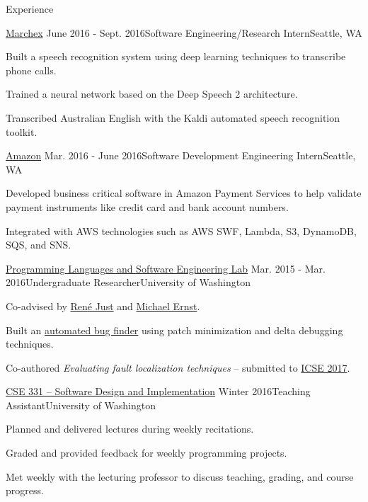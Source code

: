 \documentclass{resume} %
\begin{document}

\begin{rSection}{Experience}

  \begin{rSubsection}{\href{http://www.marchex.com/}{Marchex}}
    {June 2016 - Sept. 2016}{Software Engineering/Research Intern}{Seattle, WA}
  \item Built a speech recognition system using deep learning techniques to transcribe phone calls.
  \item Trained a neural network based on the Deep Speech 2 architecture.
  \item Transcribed Australian English with the Kaldi automated speech recognition toolkit.
  \end{rSubsection}

  \begin{rSubsection}{\href{https://www.amazon.com/}{Amazon}}
    {Mar. 2016 - June 2016}{Software Development Engineering Intern}{Seattle, WA}
  \item Developed business critical software in Amazon Payment Services to help validate payment instruments like credit card and bank account numbers.
  \item Integrated with AWS technologies such as AWS SWF, Lambda, S3, DynamoDB, SQS, and SNS.
  \end{rSubsection}

  \begin{rSubsection}{\href{https://uwplse.org/}{Programming Languages and Software Engineering Lab}}
    {Mar. 2015 - Mar. 2016}{Undergraduate Researcher}{University of Washington}
  \item Co-advised by \href{https://people.cs.umass.edu/~rjust/}{Ren{\'e} Just} and \href{https://homes.cs.washington.edu/~mernst/}{Michael Ernst}.
  \item Built an \href{https://github.com/dericp/patch-minimization}{automated bug finder} using patch minimization and delta debugging techniques.
  \item Co-authored \emph{Evaluating fault localization techniques} -- submitted to \href{http://icse2017.gatech.edu/}{ICSE 2017}.
  \end{rSubsection}
  
  \begin{rSubsection}{\href{https://courses.cs.washington.edu/courses/cse331/16wi/}{CSE 331 -- Software Design and Implementation}}
    {Winter 2016}{Teaching Assistant}{University of Washington}
  \item Planned and delivered lectures during weekly recitations.
  \item Graded and provided feedback for weekly programming projects.
  \item Met weekly with the lecturing professor to discuss teaching, grading, and course progress.
  \end{rSubsection}
  
\end{rSection}
\end{document}
